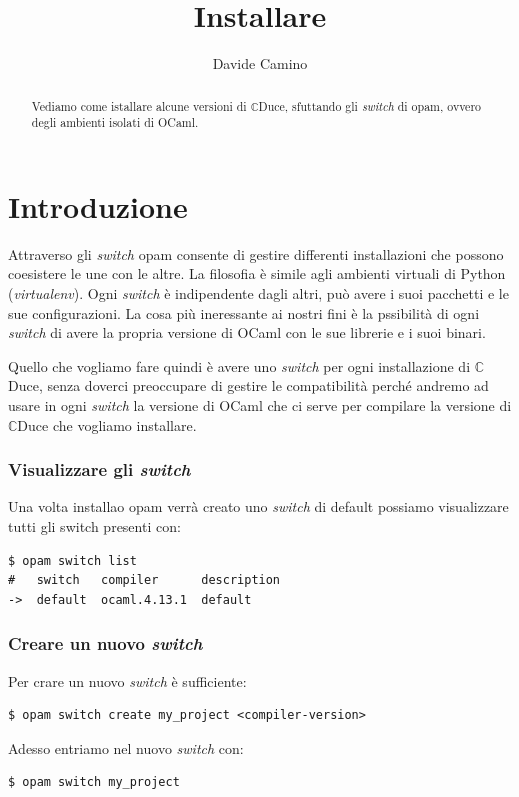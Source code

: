 \documentclass[]{article}
\title{Installare \cduce}
\author{Davide Camino}
\newcommand{\cduce}{$\mathbb {C}$Duce\xspace}
\begin{document}
\maketitle

\begin{abstract}
	Vediamo come istallare alcune versioni di \cduce, sfuttando gli \textit{switch} di opam, ovvero degli ambienti isolati di OCaml.
\end{abstract}

\section{Introduzione}
Attraverso gli \textit{switch} opam consente di gestire differenti installazioni che possono coesistere le une con le altre. La filosofia è simile agli ambienti virtuali di Python (\textit{virtualenv}). Ogni \textit{switch} è indipendente dagli altri, può avere i suoi pacchetti e le sue configurazioni. La cosa più ineressante ai nostri fini è la pssibilità di ogni \textit{switch} di avere la propria versione di OCaml con le sue librerie e i suoi binari.

Quello che vogliamo fare quindi è avere uno \textit{switch} per ogni installazione di \cduce, senza doverci preoccupare di gestire le compatibilità perché andremo ad usare in ogni \textit{switch} la versione di OCaml che ci serve per compilare la versione di \cduce che vogliamo installare.
\subsubsection*{Visualizzare gli \textit{switch}}
Una volta installao opam verrà creato uno \textit{switch} di default possiamo visualizzare tutti gli switch presenti con:
\begin{verbatim}
$ opam switch list
#   switch   compiler      description
->  default  ocaml.4.13.1  default
\end{verbatim}
\subsubsection*{Creare un nuovo \textit{switch}}
Per crare un nuovo \textit{switch} è sufficiente:
\begin{verbatim}
$ opam switch create my_project <compiler-version>
\end{verbatim}
Adesso entriamo nel nuovo \textit{switch} con:
\begin{verbatim}
$ opam switch my_project
\end{verbatim}
\end{document}
